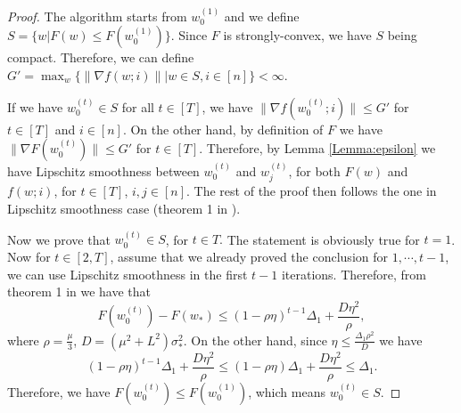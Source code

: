 \documentclass{article} %
\theoremstyle{plain}
\theoremstyle{definition}
\theoremstyle{remark}
\begin{document}
\begin{proof}

The algorithm starts from $w^{(1)}_0$ and we define $S=\{w|F(w)\leq F(w^{(1)}_0)\}.$ Since $F$ is strongly-convex, we have $S$ being compact. Therefore, we can define $G'=\max_w\{\|\nabla f(w;i)\||w\in S, i\in[n]\}<\infty.$ 

If we have $w^{(t)}_0\in S$ for all $t\in[T]$, we have $\|\nabla f(w^{(t)}_0;i)\|\leq G'$ for $t\in[T]$ and $i\in [n]$. On the other hand, by definition of $F$ we have $\|\nabla F(w^{(t)}_0)\|\leq G'$ for $t\in[T]$. Therefore, by Lemma \ref{Lemma:epsilon} we have Lipschitz smoothness between $w^{(t)}_0$ and $w^{(t)}_j$, for both $F(w)$ and $f(w;i)$, for $t\in[T]$, $i,j\in[n]$. The rest of the proof then follows the one in Lipschitz smoothness case (theorem 1 in \citet{nguyen2021unified}).

Now we prove that $w^{(t)}_0\in S$, for $t\in T.$ The statement is obviously true for $t=1$. Now for $t\in[2, T]$, assume that we already proved the conclusion for $1,\cdots, t-1$, we can use Lipschitz smoothness in the first $t-1$ iterations. Therefore, from theorem 1 in \citet{nguyen2021unified} we have that 
$$F(w^{(t)}_0)-F(w_*)\leq (1-\rho \eta)^{t-1}\Delta_1 +\frac{D\eta ^2}{\rho},$$
where $\rho=\frac{\mu}{3}$, $D= (\mu^2+L^2)\sigma^2_*.$ On the other hand, since $\eta \leq \frac{\Delta_1\rho^2}{D}$ we have 
$$(1-\rho \eta)^{t-1}\Delta_1 +\frac{D\eta ^2}{\rho}\leq (1-\rho \eta)\Delta_1 +\frac{D\eta^2}{\rho}\leq \Delta_1. $$
Therefore, we have $F(w^{(t)}_0)\leq F(w^{(1)}_0)$, which means $w^{(t)}_0\in S.$

\end{proof}




\end{document}
